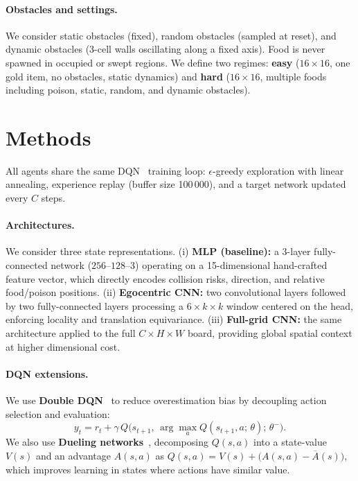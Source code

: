 \documentclass[runningheads]{llncs}
\begin{document}
\paragraph{Obstacles and settings.}
We consider static obstacles (fixed), random obstacles (sampled at reset), and
dynamic obstacles (3-cell walls oscillating along a fixed axis). Food is never
spawned in occupied or swept regions. We define two regimes:
\textbf{easy} ($16 \times 16$, one gold item, no obstacles, static dynamics)
and \textbf{hard} ($16 \times 16$, multiple foods including poison, static,
random, and dynamic obstacles).
\section{Methods}
\label{sec:methods}

All agents share the same DQN~\cite{mnih2015human} training loop: $\epsilon$-greedy exploration with
linear annealing, experience replay (buffer size 100\,000), and a target
network updated every $C$ steps.

\paragraph{Architectures.}
We consider three state representations.
(i) \textbf{MLP (baseline):} a 3-layer fully-connected network
($256$--$128$--$3$) operating on a 15-dimensional hand-crafted feature vector,
which directly encodes collision risks, direction, and relative food/poison
positions.
(ii) \textbf{Egocentric CNN:} two convolutional layers followed by two
fully-connected layers processing a $6 \times k \times k$ window centered on
the head, enforcing locality and translation equivariance.
(iii) \textbf{Full-grid CNN:} the same architecture applied to the full
$C \times H \times W$ board, providing global spatial context at higher
dimensional cost.

\paragraph{DQN extensions.}
We use \textbf{Double DQN}~\cite{van2016deep} to reduce overestimation bias by decoupling action
selection and evaluation:
\begin{equation}
  y_t = r_t + \gamma\, Q\bigl(s_{t+1},\,\arg\max_a Q(s_{t+1}, a;\,\theta);\,\theta^-\bigr).
\end{equation}
We also use \textbf{Dueling networks}~\cite{wang2016dueling}, decomposing $Q(s,a)$ into a state-value
$V(s)$ and an advantage $A(s,a)$ as
$Q(s,a) = V(s) + \bigl(A(s,a) - \overline{A}(s)\bigr)$, which improves learning
in states where actions have similar value.
\end{document}
